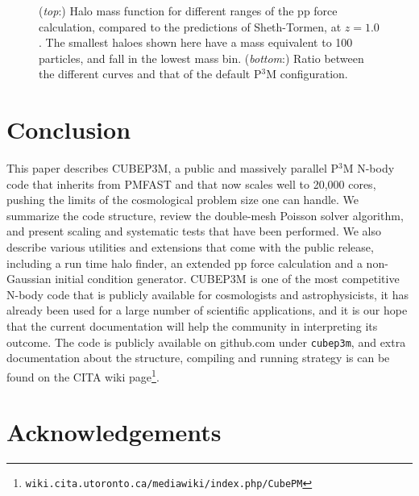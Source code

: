 \documentclass[useAMS,usenatbib]{mn2e}
\begin{document}
\begin{figure}
  \begin{center}
  \caption{ ({\it top}:) Halo mass function for different ranges of the pp force calculation, compared to the predictions of Sheth-Tormen, at $z = 1.0$. 
  The smallest haloes shown here have a mass equivalent to 100 particles, and fall in the lowest mass bin.
  ({\it bottom}:) Ratio between the different curves and that of the default P$^3$M configuration.}
    \label{fig:MassFunction_extpp}
  \end{center}
\end{figure}


%

\section{Conclusion}

This paper describes {\small CUBEP3M}, a public and  massively parallel P$^3$M N-body code that inherits from {\small PMFAST} 
 and that now scales well to 20,000 cores, pushing the limits of the cosmological problem size one can handle.
We summarize the code structure, review the double-mesh Poisson solver algorithm, and present scaling and systematic tests
that have been performed. We also describe various utilities and extensions that come with the public release, 
including a run time halo finder, an extended pp force calculation and a non-Gaussian initial condition generator.
{\small CUBEP3M} is one of the most competitive N-body code that is publicly available for cosmologists and astrophysicists,
it has already been used  for a large number of scientific applications, and it is our hope that the current documentation will 
help the community in interpreting its outcome.
The code is publicly available on github.com under {\tt cubep3m}, and extra documentation about the structure, 
compiling and running strategy is can be found on the CITA wiki page\footnote{\tt wiki.cita.utoronto.ca/mediawiki/index.php/CubePM}.

\section*{Acknowledgements}
\end{document}
